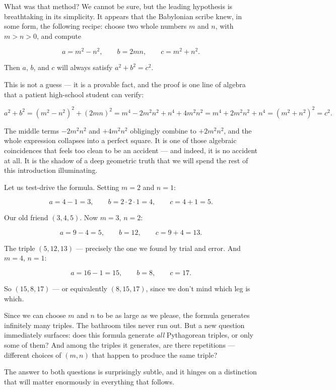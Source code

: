 What was that method? We cannot be sure, but the leading hypothesis is breathtaking in its simplicity. It appears that the Babylonian scribe knew, in some form, the following recipe: choose two whole numbers $m$ and $n$, with $m > n > 0$, and compute

\[a = m^2 - n^2, \qquad b = 2mn, \qquad c = m^2 + n^2.\]

Then $a$, $b$, and $c$ will always satisfy $a^2 + b^2 = c^2$.

This is not a guess --- it is a provable fact, and the proof is one line of algebra that a patient high-school student can verify:

\[a^2 + b^2 = (m^2 - n^2)^2 + (2mn)^2 = m^4 - 2m^2 n^2 + n^4 + 4m^2 n^2 = m^4 + 2m^2 n^2 + n^4 = (m^2 + n^2)^2 = c^2.\]

The middle terms $-2m^2 n^2$ and $+4m^2 n^2$ obligingly combine to $+2m^2 n^2$, and the whole expression collapses into a perfect square. It is one of those algebraic coincidences that feels too clean to be an accident --- and indeed, it is no accident at all. It is the shadow of a deep geometric truth that we will spend the rest of this introduction illuminating.

Let us test-drive the formula. Setting $m = 2$ and $n = 1$:

\[a = 4 - 1 = 3, \qquad b = 2 \cdot 2 \cdot 1 = 4, \qquad c = 4 + 1 = 5.\]

Our old friend $(3, 4, 5)$. Now $m = 3$, $n = 2$:

\[a = 9 - 4 = 5, \qquad b = 12, \qquad c = 9 + 4 = 13.\]

The triple $(5, 12, 13)$ --- precisely the one we found by trial and error. And $m = 4$, $n = 1$:

\[a = 16 - 1 = 15, \qquad b = 8, \qquad c = 17.\]

So $(15, 8, 17)$ --- or equivalently $(8, 15, 17)$, since we don't mind which leg is which.


Since we can choose $m$ and $n$ to be as large as we please, the formula generates infinitely many triples. The bathroom tiles never run out. But a new question immediately surfaces: does this formula generate \textit{all} Pythagorean triples, or only some of them? And among the triples it generates, are there repetitions --- different choices of $(m, n)$ that happen to produce the same triple?

The answer to both questions is surprisingly subtle, and it hinges on a distinction that will matter enormously in everything that follows.


